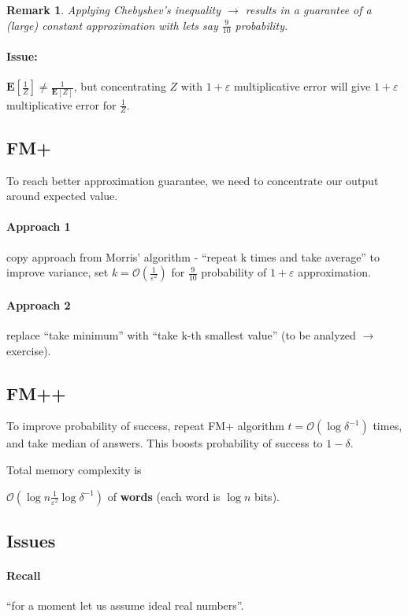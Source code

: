 \documentclass[11pt]{article}
\newcommand{\Es}{\mathbf{E}}
\newcommand{\bigo}{\mathcal{O}}
\newtheorem{remark}[theorem]{Remark}
\begin{document}
\begin{remark}
Applying Chebyshev's inequality $\rightarrow$ results in a guarantee of a (large) constant approximation with lets say $\frac{9}{10}$ probability.
\end{remark}

\paragraph{Issue:} $\Es[\frac{1}{Z}] \neq \frac{1}{\Es[Z]}$, but concentrating $Z$ with $1+\varepsilon$ multiplicative error will give $1+\varepsilon$ multiplicative error for $\frac{1}{Z}$.

\subsection{FM+}
To reach better approximation guarantee, we need to concentrate our output around expected value.
\paragraph{Approach 1} copy approach from Morris’ algorithm - ``repeat k times and take average''
to improve variance, set $k = \bigo(\frac{1}{\varepsilon^2})$ for $\frac{9}{10}$ probability of $1+ \varepsilon$ approximation.

\paragraph{Approach 2} replace ``take minimum'' with ``take k-th smallest value''
(to be analyzed $\rightarrow$ exercise).

\subsection{FM++}
To improve probability of success, repeat FM+ algorithm $t = \bigo(\log \delta^{-1})$ times, and take median of answers. This boosts probability of success to $1-\delta$.

Total memory complexity is

$\bigo(\log n  \frac{1}{\varepsilon^2} \log \delta^{-1})$ of \textbf{words} (each word is $\log n$ bits).

\subsection{Issues}

\paragraph{Recall} ``for a moment let us assume ideal real numbers''.
\end{document}
